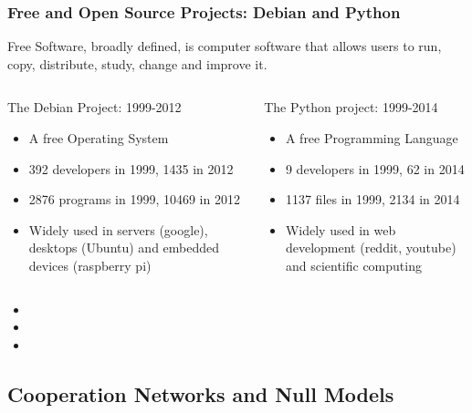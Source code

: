 \documentclass[ignorenonframetext,red,8pt,notes=hide]{beamer}
\begin{document}
\begin{frame}
\frametitle{Free and Open Source Projects: Debian and Python}

Free Software, broadly defined, is computer software that allows users to run, copy, distribute, study, change and improve it.

\begin{columns}[c]
\begin{column}{0.5\textwidth}
\begin{block}{The Debian Project: 1999-2012}
\begin{itemize}
\item A free Operating System
\item 392 developers in 1999, 1435 in 2012 
\item 2876 programs in 1999, 10469 in 2012
\item Widely used in servers (google), desktops (Ubuntu) and embedded devices (raspberry pi)
\end{itemize}
\end{block}
\end{column}

\begin{column}{0.5\textwidth}
\begin{block}{The Python project: 1999-2014}
\begin{itemize}
\item A free Programming Language
\item 9 developers in 1999, 62 in 2014
\item 1137 files in 1999, 2134 in 2014 
\item Widely used in web development (reddit, youtube) and scientific computing
\end{itemize}
\end{block}
\end{column}
\end{columns}

\begin{block}{}
\begin{itemize}
\item 
\item 
\item 
\end{itemize}
\end{block}

\end{frame}

\subsection{Cooperation Networks and Null Models}
\end{document}
